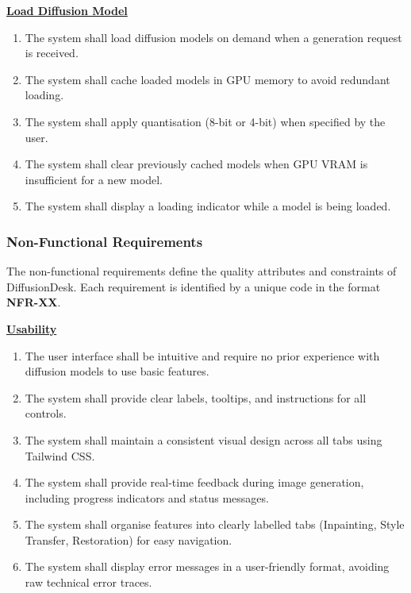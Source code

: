 \documentclass[12pt,a4paper]{report}
\begin{document}
\vspace{0.5em}
\noindent\underline{\textbf{Load Diffusion Model}}

\begin{enumerate}[label=\textbf{FR-\arabic*}.,start=37]
    \item The system shall load diffusion models on demand when a generation request is received.
    \item The system shall cache loaded models in GPU memory to avoid redundant loading.
    \item The system shall apply quantisation (8-bit or 4-bit) when specified by the user.
    \item The system shall clear previously cached models when GPU VRAM is insufficient for a new model.
    \item The system shall display a loading indicator while a model is being loaded.
\end{enumerate}

\subsubsection{Non-Functional Requirements}

The non-functional requirements define the quality attributes and constraints of DiffusionDesk. Each requirement is identified by a unique code in the format \textbf{NFR-XX}.

\vspace{0.5em}
\noindent\underline{\textbf{Usability}}

\begin{enumerate}[label=\textbf{NFR-\arabic*}.,start=1]
    \item The user interface shall be intuitive and require no prior experience with diffusion models to use basic features.
    \item The system shall provide clear labels, tooltips, and instructions for all controls.
    \item The system shall maintain a consistent visual design across all tabs using Tailwind CSS.
    \item The system shall provide real-time feedback during image generation, including progress indicators and status messages.
    \item The system shall organise features into clearly labelled tabs (Inpainting, Style Transfer, Restoration) for easy navigation.
    \item The system shall display error messages in a user-friendly format, avoiding raw technical error traces.
\end{enumerate}
\end{document}
